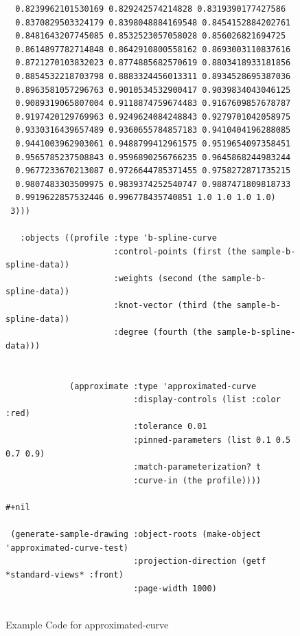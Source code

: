 \documentclass [11pt]{book}
\begin{document}
\begin{itemize}
\begin{figure}
\begin{lrbox}{\boxedverb}
\begin{minipage}{\linewidth}
{\begin{verbatim}
  0.8239962101530169 0.829242574214828 0.8319390177427586
  0.8370829503324179 0.8398048884169548 0.8454152884202761
  0.8481643207745085 0.8532523057058028 0.856026821694725
  0.8614897782714848 0.8642910800558162 0.8693003110837616
  0.8721270103832023 0.8774885682570619 0.8803418933181856
  0.8854532218703798 0.8883324456013311 0.8934528695387036
  0.8963581057296763 0.9010534532900417 0.9039834043046125
  0.9089319065807004 0.9118874759674483 0.9167609857678787
  0.9197420129769963 0.9249624084248843 0.9279701042058975
  0.9330316439657489 0.9360655784857183 0.9410404196288085
  0.9441003962903061 0.9488799412961575 0.9519654097358451
  0.9565785237508843 0.9596890256766235 0.9645868244983244
  0.9677233670213087 0.9726644785371455 0.9758272871735215
  0.9807483303509975 0.9839374252540747 0.9887471809818733
  0.9919622857532446 0.996778435740851 1.0 1.0 1.0 1.0)
 3)))
  
   :objects ((profile :type 'b-spline-curve
                      :control-points (first (the sample-b-spline-data))
                      :weights (second (the sample-b-spline-data))
                      :knot-vector (third (the sample-b-spline-data))
                      :degree (fourth (the sample-b-spline-data)))

            
             (approximate :type 'approximated-curve
                          :display-controls (list :color :red)
                          :tolerance 0.01
                          :pinned-parameters (list 0.1 0.5 0.7 0.9)
                          :match-parameterization? t
                          :curve-in (the profile))))

#+nil

 (generate-sample-drawing :object-roots (make-object 'approximated-curve-test)
                          :projection-direction (getf *standard-views* :front)
                          :page-width 1000)


\end{verbatim}}
\end{minipage}
\end{lrbox}
\fbox{\usebox{\boxedverb}}

\caption{Example Code for approximated-curve}

\label{fig:example-code-approximated-curve}

\end{figure}


\end{itemize}
\end{document}
